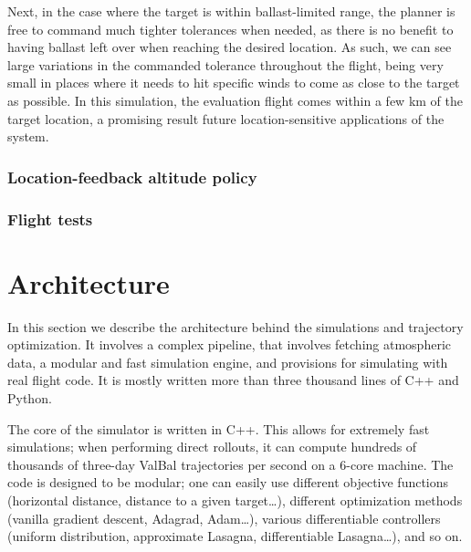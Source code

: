 \documentclass[11pt]{scrartcl} %
\begin{document}
Next, in the case where the target is within ballast-limited range, the planner is free to command much tighter tolerances when needed, as there is no benefit to having ballast left over when reaching the desired location. As such, we can see large variations in the commanded tolerance throughout the flight, being very small in places where it needs to hit specific winds to come as close to the target as possible. In this simulation, the evaluation flight comes within a few km of the target location, a promising result future location-sensitive applications of the system.


\subsubsection{Location-feedback altitude policy}
\subsubsection{Flight tests}


\newpage
\section{Architecture}
\label{arch}
In this section we describe the architecture behind the simulations and trajectory optimization. It involves a complex pipeline, that involves fetching atmospheric data, a modular and fast simulation engine, and provisions for simulating with real flight code. It is mostly written more than three thousand lines of C++ and Python.

The core of the simulator is written in C++. This allows for extremely fast simulations; when performing direct rollouts, it can compute hundreds of thousands of three-day ValBal trajectories per second on a 6-core machine. The code is designed to be modular; one can easily use different objective functions (horizontal distance, distance to a given target\dots), different optimization methods (vanilla gradient descent, Adagrad, Adam\dots), various differentiable controllers (uniform distribution, approximate Lasagna, differentiable Lasagna\dots), and so on.
\end{document}
